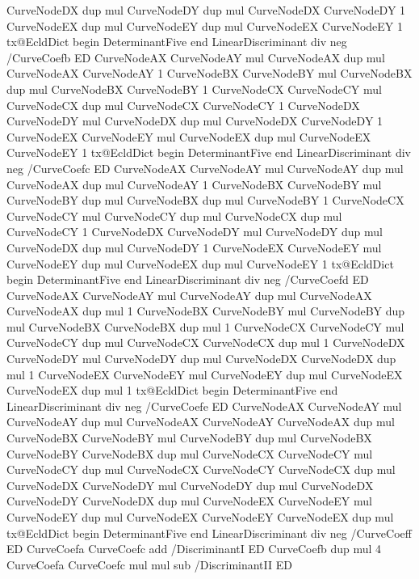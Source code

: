 {{        CurveNodeDX dup mul CurveNodeDY dup mul CurveNodeDX CurveNodeDY 1
        CurveNodeEX dup mul CurveNodeEY dup mul CurveNodeEX CurveNodeEY 1
        tx@EcldDict begin DeterminantFive end LinearDiscriminant div neg /CurveCoefb ED
        CurveNodeAX CurveNodeAY mul CurveNodeAX dup mul CurveNodeAX CurveNodeAY 1
        CurveNodeBX CurveNodeBY mul CurveNodeBX dup mul CurveNodeBX CurveNodeBY 1
        CurveNodeCX CurveNodeCY mul CurveNodeCX dup mul CurveNodeCX CurveNodeCY 1
        CurveNodeDX CurveNodeDY mul CurveNodeDX dup mul CurveNodeDX CurveNodeDY 1
        CurveNodeEX CurveNodeEY mul CurveNodeEX dup mul CurveNodeEX CurveNodeEY 1
        tx@EcldDict begin DeterminantFive end LinearDiscriminant div neg /CurveCoefc ED
        CurveNodeAX CurveNodeAY mul CurveNodeAY dup mul CurveNodeAX dup mul CurveNodeAY 1
        CurveNodeBX CurveNodeBY mul CurveNodeBY dup mul CurveNodeBX dup mul CurveNodeBY 1
        CurveNodeCX CurveNodeCY mul CurveNodeCY dup mul CurveNodeCX dup mul CurveNodeCY 1
        CurveNodeDX CurveNodeDY mul CurveNodeDY dup mul CurveNodeDX dup mul CurveNodeDY 1
        CurveNodeEX CurveNodeEY mul CurveNodeEY dup mul CurveNodeEX dup mul CurveNodeEY 1
        tx@EcldDict begin DeterminantFive end LinearDiscriminant div neg /CurveCoefd ED
        CurveNodeAX CurveNodeAY mul CurveNodeAY dup mul CurveNodeAX CurveNodeAX dup mul 1
        CurveNodeBX CurveNodeBY mul CurveNodeBY dup mul CurveNodeBX CurveNodeBX dup mul 1
        CurveNodeCX CurveNodeCY mul CurveNodeCY dup mul CurveNodeCX CurveNodeCX dup mul 1
        CurveNodeDX CurveNodeDY mul CurveNodeDY dup mul CurveNodeDX CurveNodeDX dup mul 1
        CurveNodeEX CurveNodeEY mul CurveNodeEY dup mul CurveNodeEX CurveNodeEX dup mul 1
        tx@EcldDict begin DeterminantFive end LinearDiscriminant div neg /CurveCoefe ED
        CurveNodeAX CurveNodeAY mul CurveNodeAY dup mul CurveNodeAX CurveNodeAY CurveNodeAX dup mul
        CurveNodeBX CurveNodeBY mul CurveNodeBY dup mul CurveNodeBX CurveNodeBY CurveNodeBX dup mul
        CurveNodeCX CurveNodeCY mul CurveNodeCY dup mul CurveNodeCX CurveNodeCY CurveNodeCX dup mul
        CurveNodeDX CurveNodeDY mul CurveNodeDY dup mul CurveNodeDX CurveNodeDY CurveNodeDX dup mul
        CurveNodeEX CurveNodeEY mul CurveNodeEY dup mul CurveNodeEX CurveNodeEY CurveNodeEX dup mul
        tx@EcldDict begin DeterminantFive end LinearDiscriminant div neg /CurveCoeff ED
        CurveCoefa CurveCoefc add /DiscriminantI ED
        CurveCoefb dup mul 4 CurveCoefa CurveCoefc mul mul sub /DiscriminantII ED
}}
